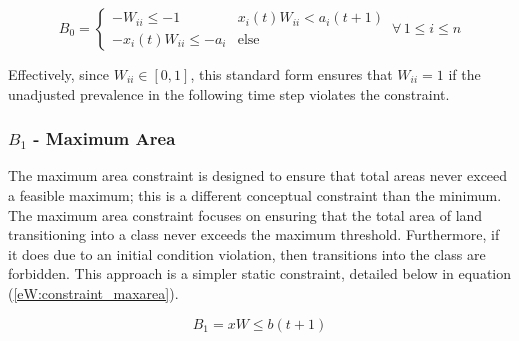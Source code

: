 \documentclass[10pt]{article}
\begin{document}
\begin{equation}\label{eW:constraint_minarea}
B_0 = \left\{
\begin{array}{rl}
-W_{ii} \leq -1 & x_i(t)W_{ii} < a_i (t + 1)\\
-x_i(t)W_{ii} \leq -a_i & \mbox{else}
\end{array}
\right.\,\forall\, 1 \leq i \leq n
\end{equation}

Effectively, since $W_{ii} \in [0, 1]$, this standard form ensures that $W_{ii} = 1$ if the unadjusted prevalence in the following time step violates the constraint.

%
%
\subsubsection*{$B_1$ - Maximum Area}

The maximum area constraint is designed to ensure that total areas never exceed a feasible maximum; this is a different conceptual constraint than the minimum. The maximum area constraint focuses on ensuring that the total area of land transitioning into a class never exceeds the maximum threshold. Furthermore, if it does due to an initial condition violation, then transitions into the class are forbidden. This approach is a simpler static constraint, detailed below in equation (\ref{eW:constraint_maxarea}).

\begin{equation}\label{eW:constraint_maxarea}
B_1 =  x W \leq b(t + 1)
\end{equation}
\end{document}
